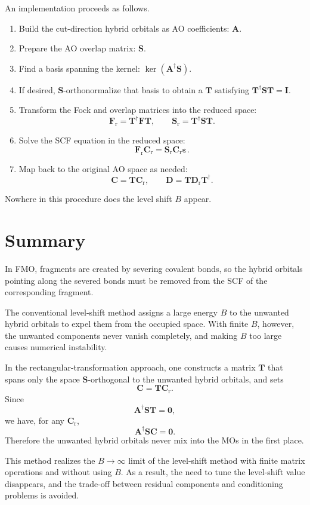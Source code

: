 \documentclass[11pt]{article}
\newcommand{\Smat}{\mathbf S}
\newcommand{\Amat}{\mathbf A}
\newcommand{\Tmat}{\mathbf T}
\newcommand{\Cmat}{\mathbf C}
\newcommand{\Cr}{\mathbf C_{\mathrm r}}
\newcommand{\Fmat}{\mathbf F}
\newcommand{\Fr}{\mathbf F_{\mathrm r}}
\newcommand{\Sr}{\mathbf S_{\mathrm r}}
\newcommand{\Dmat}{\mathbf D}
\newcommand{\Dr}{\mathbf D_{\mathrm r}}
\begin{document}
An implementation proceeds as follows.
\begin{enumerate}
\item Build the cut-direction hybrid orbitals as AO coefficients:
      \(\Amat\).
\item Prepare the AO overlap matrix: \(\Smat\).
\item Find a basis spanning the kernel:
      \(\ker(\Amat^\dagger\Smat)\).
\item If desired, \(\Smat\)-orthonormalize that basis to obtain a
      \(\Tmat\) satisfying \(\Tmat^\dagger\Smat\Tmat=\mathbf I\).
\item Transform the Fock and overlap matrices into the reduced space:
      \[
        \Fr=\Tmat^\dagger\Fmat\Tmat,\qquad
        \Sr=\Tmat^\dagger\Smat\Tmat .
      \]
\item Solve the SCF equation in the reduced space:
      \[
        \Fr\Cr=\Sr\Cr\boldsymbol\varepsilon .
      \]
\item Map back to the original AO space as needed:
      \[
        \Cmat=\Tmat\Cr,\qquad
        \Dmat=\Tmat\Dr\Tmat^\dagger .
      \]
\end{enumerate}
Nowhere in this procedure does the level shift \(B\) appear.

\section{Summary}

In FMO, fragments are created by severing covalent bonds, so the hybrid
orbitals pointing along the severed bonds must be removed from the SCF
of the corresponding fragment.

The conventional level-shift method assigns a large energy \(B\) to the
unwanted hybrid orbitals to expel them from the occupied space. With
finite \(B\), however, the unwanted components never vanish completely,
and making \(B\) too large causes numerical instability.

In the rectangular-transformation approach, one constructs a matrix
\(\Tmat\) that spans only the space \(\Smat\)-orthogonal to the
unwanted hybrid orbitals, and sets
\[
  \Cmat=\Tmat\Cr .
\]
Since
\[
  \Amat^\dagger\Smat\Tmat=\mathbf 0 ,
\]
we have, for any \(\Cr\),
\[
  \Amat^\dagger\Smat\Cmat=\mathbf 0 .
\]
Therefore the unwanted hybrid orbitals never mix into the MOs in the
first place.

This method realizes the \(B\to\infty\) limit of the level-shift method
with finite matrix operations and without using \(B\). As a result, the
need to tune the level-shift value disappears, and the trade-off
between residual components and conditioning problems is avoided.
\end{document}
